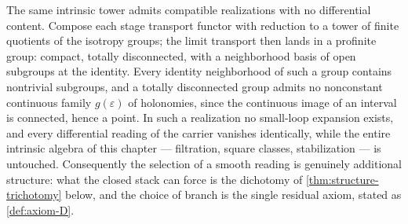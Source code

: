 \begin{remark}
	\label{rem:disconnected-ghost}
	The same intrinsic tower admits compatible realizations with no
	differential content.  Compose each stage transport functor with
	reduction to a tower of finite quotients of the isotropy groups; the
	limit transport then lands in a profinite group: compact, totally
	disconnected, with a neighborhood basis of open subgroups at the
	identity.  Every identity neighborhood of such a group contains
	nontrivial subgroups, and a totally disconnected group admits no
	nonconstant continuous family \(g(\varepsilon)\) of holonomies,
	since the continuous image of an interval is connected, hence a
	point.  In such a realization no small-loop expansion exists, and
	every differential reading of the carrier vanishes identically,
	while the entire intrinsic algebra of this chapter --- filtration,
	square classes, stabilization --- is untouched.  Consequently the
	selection of a smooth reading is genuinely additional structure:
	what the closed stack can force is the dichotomy of
	\cref{thm:structure-trichotomy} below, and the choice of branch is
	the single residual axiom, stated as \cref{def:axiom-D}.
\end{remark}
